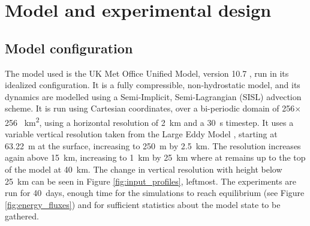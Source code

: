\documentclass[11pt,a4paper]{article}
\begin{document}
\section{Model and experimental design}

\subsection{Model configuration}


The model used is the UK Met Office Unified Model, version 10.7 \parencite{walters2017met}, run in its idealized configuration. It is a fully compressible, non-hydrostatic model, and its dynamics are modelled using a Semi-Implicit, Semi-Lagrangian (SISL) advection scheme. It is run using Cartesian coordinates, over a bi-periodic domain of 256$\times$256 \SI{}{km^2}, using a horizontal resolution of \SI{2}{km} and a \SI{30}{s} timestep. It uses a variable vertical resolution taken from the Large Eddy Model \parencite{petch2001sensitivity}, starting at \SI{63.22}{m} at the surface, increasing to \SI{250}{m} by \SI{2.5}{km}. The resolution increases again above \SI{15}{km}, increasing to \SI{1}{km} by \SI{25}{km} where at remains up to the top of the model at \SI{40}{km}. The change in vertical resolution with height below \SI{25}{km} can be seen in Figure \ref{fig:input_profiles}, leftmost.
The experiments are run for \SI{40}{days}, enough time for the simulations to reach equilibrium (see Figure \ref{fig:energy_fluxes}) and for sufficient statistics about the model state to be gathered. 
\end{document}

